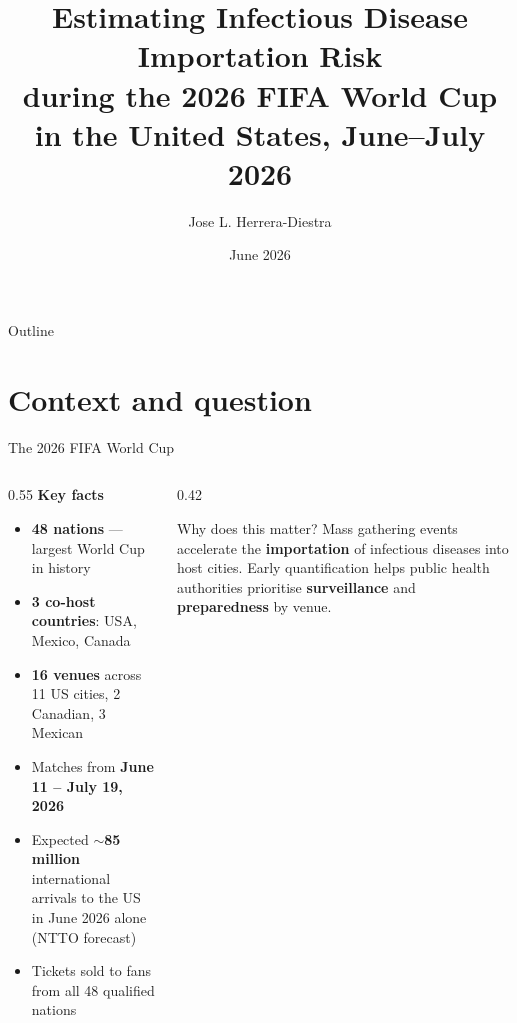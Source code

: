 \documentclass[aspectratio=169, 11pt]{beamer}
\title[WC 2026 Importation Risk]{%
  Estimating Infectious Disease Importation Risk\\
  during the 2026 FIFA World Cup\\
  in the United States, June--July 2026}
\author{Jose L. Herrera-Diestra}
\institute{Tarleton State University}
\date{June 2026}
\begin{document}

\begin{frame}
  \titlepage
\end{frame}

\begin{frame}{Outline}
  \tableofcontents[hideallsubsections]
\end{frame}

\section{Context and question}

\begin{frame}{The 2026 FIFA World Cup}
  \begin{columns}[T]
    \begin{column}{0.55\textwidth}
      \textbf{Key facts}
      \begin{itemize}
        \item \textbf{48 nations} — largest World Cup in history
        \item \textbf{3 co-host countries}: USA, Mexico, Canada
        \item \textbf{16 venues} across 11 US cities, 2 Canadian,
              3 Mexican
        \item Matches from \textbf{June 11 – July 19, 2026}
        \item Expected \textbf{$\sim$85 million} international
              arrivals to the US in June 2026 alone (NTTO forecast)
        \item Tickets sold to fans from all 48 qualified nations
      \end{itemize}
    \end{column}
    \begin{column}{0.42\textwidth}
      \vspace{0.5em}
      \begin{block}{Why does this matter?}
        Mass gathering events accelerate the \textbf{importation}
        of infectious diseases into host cities.
        Early quantification helps public health authorities
        prioritise \textbf{surveillance} and
        \textbf{preparedness} by venue.
      \end{block}
    \end{column}
  \end{columns}
\end{frame}
\end{document}
